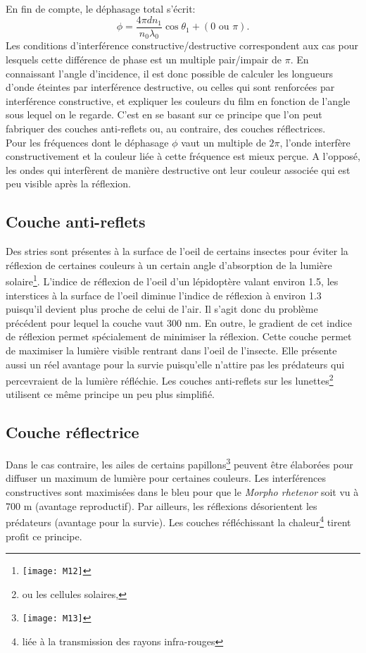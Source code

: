 En fin de compte, le déphasage total s'écrit:
$$\phi=\frac{4\pi dn_1}{n_0\lambda_0 }\cos \theta_1+(0\mbox{ ou }\pi).$$
Les conditions d'interférence constructive/destructive correspondent aux cas pour lesquels cette différence de phase est un multiple pair/impair de $\pi$. En connaissant l'angle d'incidence, il est donc possible de calculer les longueurs d'onde éteintes par interférence destructive, ou celles qui sont renforcées par interférence constructive, et expliquer les couleurs du film en fonction de l'angle sous lequel on le regarde. C'est en se basant sur ce principe que l'on peut
fabriquer des couches anti-reflets ou, au contraire, des couches réflectrices.\\

Pour les fréquences dont le déphasage $\phi$ vaut un multiple de $2\pi$, l'onde interfère constructivement et la couleur liée à cette fréquence est mieux perçue. A l'opposé, les ondes qui interfèrent de manière destructive ont leur couleur associée qui est peu visible après la réflexion.

\subsection{Couche anti-reflets}

Des stries sont présentes à la surface de l'oeil de certains insectes pour éviter la réflexion de certaines couleurs à un certain angle d'absorption de la lumière solaire\footnote{\texttt{[image: M12]}}. L'indice de réflexion de l'oeil d'un lépidoptère valant environ 1.5, les interstices à la surface de l'oeil diminue l'indice de réflexion à environ 1.3 puisqu'il devient plus proche de celui de l'air. Il s'agit donc du problème précédent pour lequel la couche vaut 300 nm. En outre, le gradient de cet indice de réflexion permet spécialement de minimiser la réflexion. Cette couche permet de maximiser la lumière visible rentrant dans l'oeil de l'insecte. Elle présente aussi un réel avantage pour la survie puisqu'elle n'attire pas les prédateurs qui percevraient de la lumière réfléchie. Les couches anti-reflets sur les lunettes\footnote{ou les cellules solaires, \ldot} utilisent ce même principe un peu plus simplifié.
\newpage

\subsection{Couche réflectrice}

Dans le cas contraire, les ailes de certains papillons\footnote{\texttt{[image: M13]}} peuvent être élaborées pour diffuser un maximum de lumière pour certaines couleurs. Les interférences constructives sont maximisées dans le bleu pour que le \textit{Morpho rhetenor} soit vu à 700 m (avantage reproductif).	Par ailleurs, les réflexions désorientent les prédateurs (avantage pour la survie). Les couches réfléchissant la chaleur\footnote{liée à la transmission des rayons infra-rouges} tirent profit ce principe.

